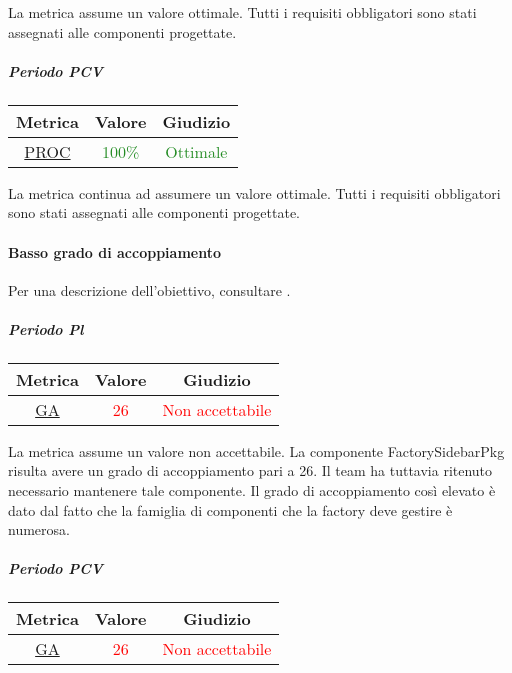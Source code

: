 				La metrica assume un valore ottimale. Tutti i requisiti obbligatori sono stati assegnati alle componenti progettate.
				
				\subparagraph{Periodo PCV}
				
				\begin{table}[H]
					\centering
					\begin{tabular}{  c | c | c}
						\hline
						\textbf{Metrica} & \textbf{Valore} & \textbf{Giudizio} \\
						\hline
						\hyperref[MMC]{PROC}   & \textcolor{ForestGreen}{100\%}          & \textcolor{ForestGreen}{Ottimale} \\ \hline
					\end{tabular} 
				\end{table}
				
				La metrica continua ad assumere un valore ottimale. Tutti i requisiti obbligatori sono stati assegnati alle componenti progettate.
				
				\newpage
				\paragraph{Basso grado di accoppiamento}
					Per una descrizione dell'obiettivo, consultare .
					\subparagraph{Periodo Pl}
					
					\begin{table}[H]
						\centering
						\begin{tabular}{  c | c | c}
							\hline
							\textbf{Metrica} & \textbf{Valore} & \textbf{Giudizio} \\
							\hline
							 \hyperref[MMC]{GA}   & \textcolor{Red}{26}          & \textcolor{Red}{Non accettabile} \\ \hline
						\end{tabular} 
					\end{table}
				
				La metrica assume un valore non accettabile. La componente FactorySidebarPkg risulta avere un grado di accoppiamento pari a 26. Il team ha tuttavia ritenuto necessario mantenere tale componente. Il grado di accoppiamento così elevato è dato dal fatto che la famiglia di componenti che la factory deve gestire è numerosa.
				
					\subparagraph{Periodo PCV}
				
				\begin{table}[H]
					\centering
					\begin{tabular}{  c | c | c}
						\hline
						\textbf{Metrica} & \textbf{Valore} & \textbf{Giudizio} \\
						\hline
						\hyperref[MMC]{GA}   & \textcolor{Red}{26}          & \textcolor{Red}{Non accettabile} \\ \hline
					\end{tabular} 
				\end{table}
				
